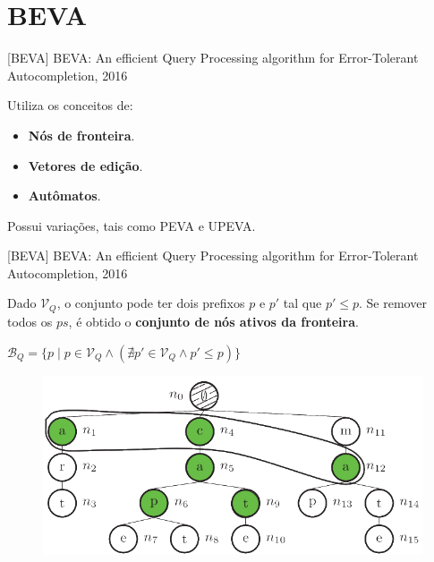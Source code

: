 \documentclass[11pt]{beamer}
\begin{document}
\section{BEVA}

\begin{frame}{[BEVA] BEVA: An efficient Query Processing algorithm for Error-Tolerant Autocompletion, 2016}

    \large
    Utiliza os conceitos de:
    
    \begin{itemize}
        \item \textbf{Nós de fronteira}. 
        \item \textbf{Vetores de edição}.
        \item \textbf{Autômatos}.
    \end{itemize}
    
    Possui variações, tais como PEVA e UPEVA.
    
\end{frame}

\begin{frame}{[BEVA] BEVA: An efficient Query Processing algorithm for Error-Tolerant Autocompletion, 2016}

    Dado $\mathcal{V}_Q$, o conjunto pode ter dois prefixos $p$ e $p'$ tal que $p' \le p$. Se remover todos os $ps$, é obtido o \textbf{conjunto de nós ativos da fronteira}.
    
    $\mathcal{B}_Q =  \{ p \mid p \in \mathcal{V}_Q \land (\nexists p' \in \mathcal{V}_Q \land p' \le p)\}$ 

    \begin{figure}
      \includegraphics[scale=0.35]{pictures/boundary_active_nodes_beva.png}
      \centering
    \end{figure}
    
\end{frame}
\end{document}
